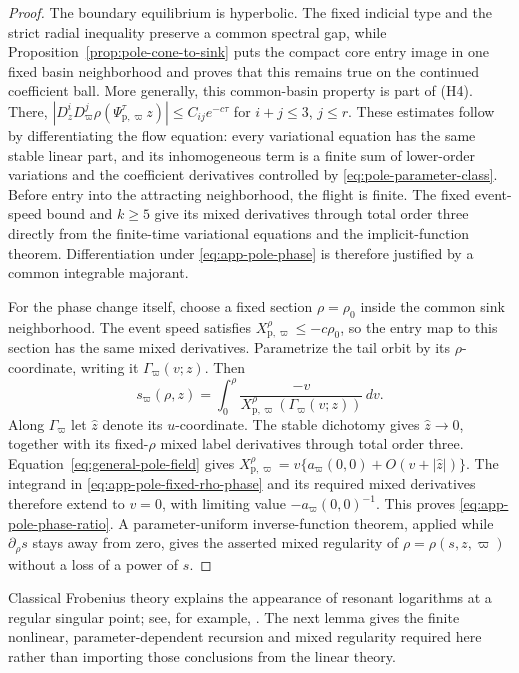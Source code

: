\documentclass[11pt]{amsart}
\numberwithin{equation}{section}
\theoremstyle{definition}
\theoremstyle{remark}
\begin{document}
\begin{proof}
The boundary equilibrium is hyperbolic.  The fixed indicial type and the
strict radial inequality preserve a common spectral gap, while
Proposition~\ref{prop:pole-cone-to-sink} puts the compact core entry image
in one fixed basin neighborhood and proves that this remains true on the
continued coefficient ball.  More generally, this common-basin property
is part of \textup{(H4)}.  There,
$|D_z^iD_\varpi^j\rho(\Psi_{\mathrm p,\varpi}^\tau z)|
 \le C_{ij}e^{-c\tau}$
for $i+j\le3$, $j\le r$.  These estimates follow by differentiating the
flow equation: every variational equation has the same stable linear part,
and its inhomogeneous term is a finite sum of lower-order variations and
the coefficient derivatives controlled by
\eqref{eq:pole-parameter-class}.  Before entry into the attracting
neighborhood, the flight is finite.  The fixed event-speed bound and
$k\ge5$ give its mixed derivatives through total order three directly from
the finite-time variational equations and the implicit-function theorem.
Differentiation under
\eqref{eq:app-pole-phase} is therefore justified by a common integrable
majorant.

For the phase change itself, choose a fixed section $\rho=\rho_0$ inside
the common sink neighborhood.  The event speed satisfies
$X_{\mathrm p,\varpi}^\rho\le-c\rho_0$, so the entry map to this section
has the same mixed derivatives.  Parametrize the tail orbit by its
$\rho$-coordinate, writing it $\Gamma_\varpi(v;z)$.  Then
\begin{equation}\label{eq:app-pole-fixed-rho-phase}
 s_\varpi(\rho,z)
 =\int_0^\rho
   \frac{-v}
   {X_{\mathrm p,\varpi}^\rho(\Gamma_\varpi(v;z))}\,dv.
\end{equation}
Along $\Gamma_\varpi$ let $\widehat z$ denote its $u$-coordinate.  The
stable dichotomy gives
$\widehat z\to0$, together with its fixed-$\rho$ mixed label derivatives
through total order three.  Equation~\eqref{eq:general-pole-field} gives
$X_{\mathrm p,\varpi}^\rho
=v\{a_\varpi(0,0)+O(v+|\widehat z|)\}$.
The integrand in \eqref{eq:app-pole-fixed-rho-phase} and its required mixed
derivatives therefore extend to $v=0$, with limiting value
$-a_\varpi(0,0)^{-1}$.  This proves
\eqref{eq:app-pole-phase-ratio}.  A
parameter-uniform inverse-function theorem, applied while
$\partial_\rho s$ stays away from zero, gives the asserted mixed regularity
of $\rho=\rho(s,z,\varpi)$ without a loss of a power of $s$.
\end{proof}

Classical Frobenius theory explains the appearance of resonant logarithms
at a regular singular point; see, for example,
\cite{Wasow1965Asymptotic}.  The next lemma gives the finite nonlinear,
parameter-dependent recursion and mixed regularity required here rather
than importing those conclusions from the linear theory.
\end{document}
